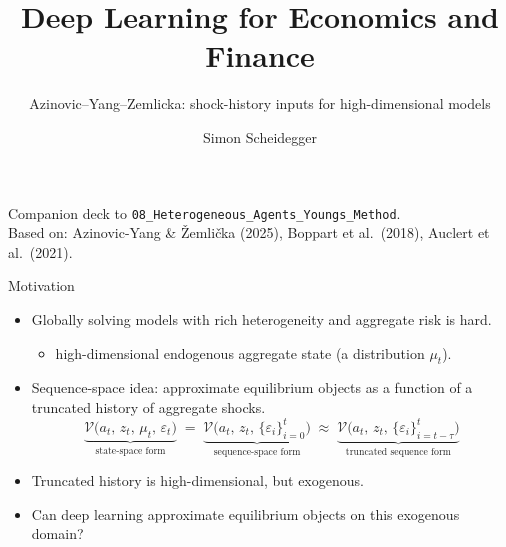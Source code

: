 \documentclass[aspectratio=169,11pt]{beamer}
\title[Deep Learning for Dynamic Economic Models]
{Deep Learning for Economics and Finance}
\subtitle{Azinovic--Yang--Zemlicka: shock-history inputs for high-dimensional models}
\author{Simon Scheidegger}
\institute[HEC Lausanne]{HEC, University of Lausanne}
\date{}
\newcommand{\emphc}[1]{\textcolor{harvardcrimson}{#1}}
\begin{document}
{
\begin{frame}
\titlepage
\vspace{-0.4cm}
\begin{center}
{\footnotesize Companion deck to \texttt{08\_Heterogeneous\_Agents\_Youngs\_Method}.}\\[4pt]
{\footnotesize Based on: Azinovic-Yang \& \v{Z}emli\v{c}ka (2025), Boppart et al.\ (2018), Auclert et al.\ (2021).}
\end{center}
\end{frame}
}


\begin{frame}{Motivation}
\small
\begin{itemize}\itemsep6pt
\item Globally solving models with rich \emphc{heterogeneity} and \emphc{aggregate risk} is hard.
    \begin{itemize}
        \item[$\rightarrow$] high-dimensional \emphc{endogenous} aggregate state (a distribution $\mu_t$).
    \end{itemize}

\item \emphc{Sequence-space idea:} approximate equilibrium objects as a function of a \emphc{truncated history of aggregate shocks}.
\[
\underbrace{\mathcal{V}\bigl(a_t,\, z_t,\, \mu_t,\, \varepsilon_t\bigr)}_{\text{state-space form}}
\;=\;
\underbrace{\mathcal{V}\bigl(a_t,\, z_t,\, \{\varepsilon_i\}_{i=0}^{t}\bigr)}_{\text{sequence-space form}}
\;\approx\;
\underbrace{\mathcal{V}\bigl(a_t,\, z_t,\, \{\varepsilon_i\}_{i=t-\tau}^{t}\bigr)}_{\text{truncated sequence form}}
\]

\item Truncated history is high-dimensional, but \emphc{exogenous}.
\item Can deep learning approximate equilibrium objects on this exogenous domain?
\end{itemize}
\end{frame}
\end{document}
